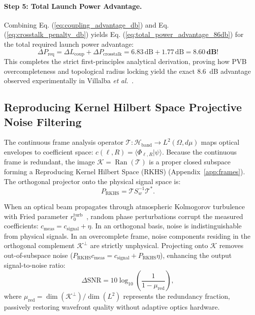 \documentclass{optica-article}
\begin{document}
\paragraph{Step 5: Total Launch Power Advantage.}
Combining Eq. (\ref{eq:coupling_advantage_db}) and Eq. (\ref{eq:crosstalk_penalty_db}) yields Eq. (\ref{eq:total_power_advantage_86db}) for the total required launch power advantage:
\begin{equation}
\boxed{\Delta P_{\text{req}} = \Delta L_{\text{coup}} + \Delta P_{\text{crosstalk}} = 6.83\,\text{dB} + 1.77\,\text{dB} = \mathbf{8.60\,\text{dB}}!}
\label{eq:total_power_advantage_86db}
\end{equation}
This completes the strict first-principles analytical derivation, proving how PVB overcompleteness and topological radius locking yield the exact 8.6~dB advantage observed experimentally in Villalba \emph{et al.}~\cite{Villalba2023}.

\subsection{Reproducing Kernel Hilbert Space Projective Noise Filtering}

The continuous frame analysis operator $\mathcal{T}: \mathcal{H}_{\text{band}} \to L^2(\Omega, d\mu)$ maps optical envelopes to coefficient space: $c(\ell, R) = \langle \Phi_{\ell, R} | \psi \rangle$. Because the continuous frame is redundant, the image $\mathcal{K} = \operatorname{Ran}(\mathcal{T})$ is a proper closed subspace forming a Reproducing Kernel Hilbert Space (RKHS) (Appendix~\ref{app:frames}). The orthogonal projector onto the physical signal space is:
\begin{equation}
\boxed{P_{\text{RKHS}} = \mathcal{T} S_w^{-1} \mathcal{T}^*.}
\label{eq:rkhs_projector}
\end{equation}

When an optical beam propagates through atmospheric Kolmogorov turbulence with Fried parameter $r_0^{\text{turb}}$~\cite{Kolmogorov1941,Fried1966,Noll1976,Paterson2005,TylerBoyd2009}, random phase perturbations corrupt the measured coefficients: $c_{\text{meas}} = c_{\text{signal}} + \eta$. In an orthogonal basis, noise is indistinguishable from physical signals. In an overcomplete frame, noise components residing in the orthogonal complement $\mathcal{K}^\perp$ are strictly unphysical. Projecting onto $\mathcal{K}$ removes out-of-subspace noise ($P_{\text{RKHS}} c_{\text{meas}} = c_{\text{signal}} + P_{\text{RKHS}} \eta$), enhancing the output signal-to-noise ratio:
\begin{equation}
\Delta \text{SNR} = 10 \log_{10}\left( \frac{1}{1 - \mu_{\text{red}}} \right),
\label{eq:snr_gain_formula}
\end{equation}
where $\mu_{\text{red}} = \operatorname{dim}(\mathcal{K}^\perp) / \operatorname{dim}(L^2)$ represents the redundancy fraction, passively restoring wavefront quality without adaptive optics hardware.
\end{document}
